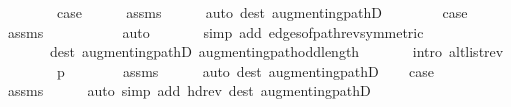 \begin{isabellebody}
\ \ \isamarkupfalse%
\ {}\isanewline
\ \ \isamarkupfalse%
\ {\isacharquery}{\kern0pt}case\isanewline
\ \ \ \ \isamarkupfalse%
\ assms\isanewline
\ \ \ \ \isamarkupfalse%
\ {\isacharparenleft}{\kern0pt}auto\ dest{\isacharcolon}{\kern0pt}\ augmenting{\isacharunderscore}{\kern0pt}pathD{\isacharparenleft}{\kern0pt}{}{\isacharparenright}{\kern0pt}{\isacharparenright}{\kern0pt}\isanewline
{}\isamarkupfalse%
\isanewline
\ \ \isamarkupfalse%
\ {}\isanewline
\ \ \isamarkupfalse%
\ {\isacharquery}{\kern0pt}case\isanewline
\ \ \ \ \isamarkupfalse%
\ assms\isanewline
\ \ \ \ \isamarkupfalse%
\isanewline
\ \ \ \ \ \ {\isacharparenleft}{\kern0pt}auto\isanewline
\ \ \ \ \ \ \ simp\ add{\isacharcolon}{\kern0pt}\ edges{\isacharunderscore}{\kern0pt}of{\isacharunderscore}{\kern0pt}path{\isacharunderscore}{\kern0pt}rev{\isacharbrackleft}{\kern0pt}symmetric{\isacharbrackright}{\kern0pt}\isanewline
\ \ \ \ \ \ \ dest{\isacharcolon}{\kern0pt}\ augmenting{\isacharunderscore}{\kern0pt}pathD{\isacharparenleft}{\kern0pt}{}{\isacharparenright}{\kern0pt}\ augmenting{\isacharunderscore}{\kern0pt}path{\isacharunderscore}{\kern0pt}odd{\isacharunderscore}{\kern0pt}length\isanewline
\ \ \ \ \ \ \ intro{\isacharcolon}{\kern0pt}\ alt{\isacharunderscore}{\kern0pt}list{\isacharunderscore}{\kern0pt}rev{\isacharparenright}{\kern0pt}\isanewline
{}\isamarkupfalse%
\isanewline
\ \ \isamarkupfalse%
\ {}\isanewline
\ \ \isamarkupfalse%
\ {\isachardoublequoteopen}p\ {\isasymnoteq}\ {\isacharbrackleft}{\kern0pt}{\isacharbrackright}{\kern0pt}{\isachardoublequoteclose}\isanewline
\ \ \ \ \isamarkupfalse%
\ assms\isanewline
\ \ \ \ \isamarkupfalse%
\ {\isacharparenleft}{\kern0pt}auto\ dest{\isacharcolon}{\kern0pt}\ augmenting{\isacharunderscore}{\kern0pt}pathD{\isacharparenleft}{\kern0pt}{}{\isacharparenright}{\kern0pt}{\isacharparenright}{\kern0pt}\isanewline
\ \ \isamarkupfalse%
\ {\isacharquery}{\kern0pt}case\isanewline
\ \ \ \ \isamarkupfalse%
\ assms\isanewline
\ \ \ \ \isamarkupfalse%
\ {\isacharparenleft}{\kern0pt}auto\ simp\ add{\isacharcolon}{\kern0pt}\ hd{\isacharunderscore}{\kern0pt}rev\ dest{\isacharcolon}{\kern0pt}\ augmenting{\isacharunderscore}{\kern0pt}pathD{\isacharparenleft}{\kern0pt}{}{\isacharparenright}{\kern0pt}{\isacharparenright}{\kern0pt}\isanewline

\end{isabellebody}
